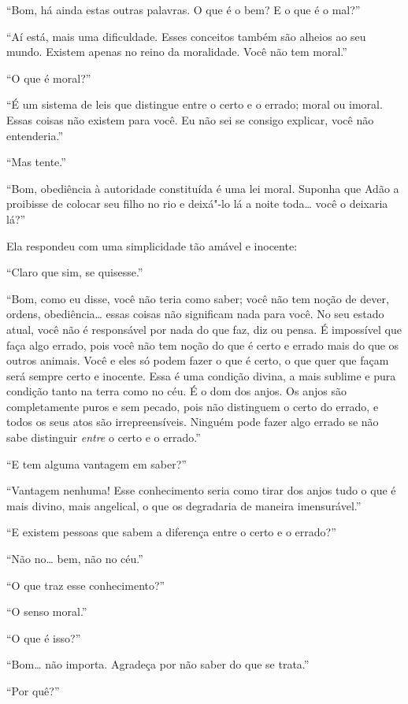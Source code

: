 ``Bom, há ainda estas outras palavras. O que é o bem? E o que
é o mal?''

``Aí está, mais uma dificuldade. Esses conceitos também são alheios ao
seu mundo. Existem apenas no reino da
moralidade. Você não tem moral.''

``O que é moral?''

``É um sistema de leis que distingue entre o certo e o errado;
moral ou imoral. Essas coisas não existem para você. Eu não sei se consigo
explicar, você não entenderia.''

``Mas tente.''

``Bom, obediência à autoridade constituída é uma lei moral.
Suponha que Adão a proibisse de colocar seu filho no rio e deixá"-lo lá a
noite toda\ldots{} você o deixaria lá?''

Ela respondeu com uma simplicidade tão amável e
inocente:

``Claro que sim, se quisesse.''

``Bom, como eu disse, você não teria como saber; você não tem
noção de dever, ordens, obediência\ldots{} essas coisas não significam nada para você. No
seu estado atual, você não é responsável por nada do que faz, diz ou
pensa. É impossível que faça algo errado, pois você não tem noção
do que é certo e errado mais do que os outros animais. Você e eles só podem
fazer o que é certo, o que quer que façam será sempre
certo e inocente. Essa é uma condição divina, a mais sublime e pura
condição tanto na terra como no céu. É o dom dos anjos. Os anjos são
completamente puros e sem pecado, pois não distinguem o certo do errado, e
todos os seus atos são irrepreensíveis. Ninguém pode fazer algo errado se
não sabe distinguir \textit{entre} o certo e o errado.''

``E tem alguma vantagem em saber?''

``Vantagem nenhuma! Esse conhecimento seria como tirar dos
anjos tudo o que é mais divino, mais angelical, o que os degradaria de
maneira imensurável.''

``E existem pessoas que sabem a diferença entre o certo e o
errado?''

``Não no\ldots{} bem, não no céu.''

``O que traz esse conhecimento?''

``O senso moral.''

``O que é isso?''

``Bom\ldots{} não importa. Agradeça por não
saber do que se trata.''

``Por quê?''


